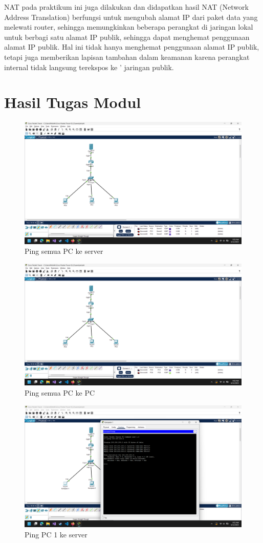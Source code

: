 NAT pada praktikum ini juga dilakukan dan didapatkan hasil NAT (Network Address Translation) berfungsi untuk mengubah alamat IP dari paket data yang melewati router,
sehingga memungkinkan beberapa perangkat di jaringan lokal untuk berbagi satu alamat IP publik, sehingga dapat
menghemat penggunaan alamat IP publik. Hal ini tidak hanya menghemat penggunaan alamat IP publik, tetapi juga 
memberikan lapisan tambahan dalam keamanan karena perangkat internal tidak langsung terekspos ke '
jaringan publik.



\section{Hasil Tugas Modul}
    \begin{figure}[H]
        \centering
        \includegraphics[width=0.5\linewidth]{pingsemuakeserver.png}
        \caption{Ping semua PC ke server}
        \label{fig:gambar}
    \end{figure}

    \begin{figure}[H]
        \centering
        \includegraphics[width=0.5\linewidth]{pingpckepc.png}
        \caption{Ping semua PC ke PC}
        \label{fig:gambar}
    \end{figure}

    \begin{figure}[H]
        \centering
        \includegraphics[width=0.5\linewidth]{pingpc1keserver.png}
        \caption{Ping PC 1 ke server}
        \label{fig:gambar}
    \end{figure}

